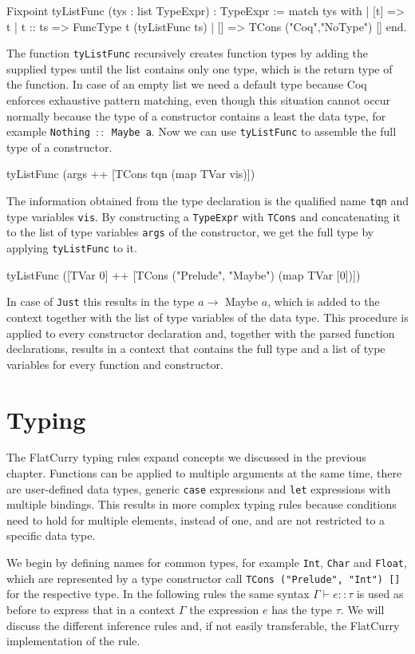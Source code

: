 \documentclass[paper = a4, fleqn, twoside]{scrreprt}
\newcommand{\coqinline}[1]{\texttt{#1}}
\begin{document}
\begin{coqcode}
Fixpoint tyListFunc (tys : list TypeExpr) : TypeExpr :=
  match tys with
  | [t]     => t
  | t :: ts => FuncType t (tyListFunc ts)
  | []      => TCons ("Coq","NoType") []
  end.
\end{coqcode}
The function \coqinline{tyListFunc} recursively creates function types by adding the supplied types until the list contains only one type, which is the return type of the function. In case of an empty list we need a default type because Coq enforces exhaustive pattern matching, even though this situation cannot occur normally because the type of a constructor contains a least the data type, for example \texttt{Nothing $::$ Maybe a}. Now we can use \coqinline{tyListFunc} to assemble the full type of a constructor.
\begin{coqcode}
tyListFunc (args ++ [TCons tqn (map TVar vis)])
\end{coqcode}
The information obtained from the type declaration is the qualified name \texttt{tqn} and type variables \texttt{vis}. By constructing a \coqinline{TypeExpr} with \coqinline{TCons} and concatenating it to the list of type variables \texttt{args} of the constructor, we get the full type by applying \coqinline{tyListFunc} to it.
\begin{coqcode}
tyListFunc ([TVar 0] ++ [TCons ("Prelude", "Maybe") (map TVar [0])])
\end{coqcode} 
In case of \texttt{Just} this results in the type $a \rightarrow$ Maybe $a$, which is added to the context together with the list of type variables of the data type. This procedure is applied to every constructor declaration and, together with the parsed function declarations, results in a context that contains the full type and a list of type variables for every function and constructor.
\section{Typing}

The FlatCurry typing rules expand concepts we discussed in the previous chapter. Functions can be applied to multiple arguments at the same time, there are user-defined data types, generic \texttt{case} expressions and \texttt{let} expressions with multiple bindings. This results in more complex typing rules because conditions need to hold for multiple elements, instead of one, and are not restricted to a specific data type.
\par 
We begin by defining names for common types, for example \texttt{Int}, \texttt{Char} and \texttt{Float}, which are represented by a type constructor call \texttt{TCons ("Prelude", "Int") []} for the respective type.
In the following rules the same syntax $\Gamma \vdash e :: \tau$ is used as before to express that in a context $\Gamma$ the expression $e$ has the type $\tau$. We will discuss the different inference rules and, if not easily transferable, the FlatCurry implementation of the rule.
\end{document}

